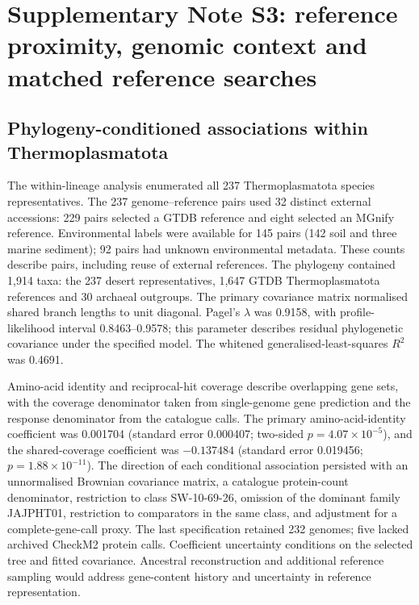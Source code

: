 \section*{Supplementary Note S3: reference proximity, genomic context and matched reference searches}

\subsection*{Phylogeny-conditioned associations within Thermoplasmatota}
The within-lineage analysis enumerated all 237 Thermoplasmatota species representatives.
The 237 genome--reference pairs used 32 distinct external accessions: 229 pairs selected a GTDB
reference and eight selected an MGnify reference. Environmental labels were available for 145
pairs (142 soil and three marine sediment); 92 pairs had unknown environmental metadata.
These counts describe pairs, including reuse of external references. The phylogeny contained
1{,}914 taxa: the 237 desert representatives, 1{,}647 GTDB Thermoplasmatota references and 30
archaeal outgroups. The primary covariance matrix normalised shared branch lengths to unit
diagonal. Pagel's $\lambda$ was 0.9158, with profile-likelihood interval 0.8463--0.9578;
this parameter describes residual phylogenetic covariance under the specified model.
The whitened generalised-least-squares $R^2$ was 0.4691.

Amino-acid identity and reciprocal-hit coverage describe overlapping gene sets, with the
coverage denominator taken from single-genome gene prediction and the response denominator
from the catalogue calls. The primary amino-acid-identity coefficient was 0.001704
(standard error 0.000407; two-sided $p=4.07\times10^{-5}$), and the shared-coverage coefficient
was $-0.137484$ (standard error 0.019456; $p=1.88\times10^{-11}$).
The direction of each conditional association persisted with an unnormalised Brownian
covariance matrix, a catalogue protein-count denominator, restriction to class SW-10-69-26,
omission of the dominant family JAJPHT01, restriction to comparators in the same class,
and adjustment for a complete-gene-call proxy. The last specification retained 232 genomes;
five lacked archived CheckM2 protein calls. Coefficient uncertainty conditions on the selected
tree and fitted covariance. Ancestral reconstruction and additional reference sampling would
address gene-content history and uncertainty in reference representation.

